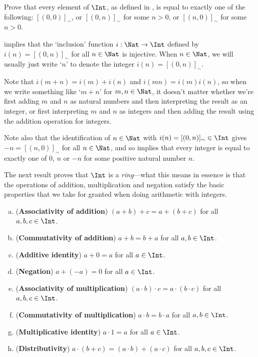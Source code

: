 \begin{exercise}
\label{exRepresentativesOfElementsOfZ}
Prove that every element of $\Int$, as defined in , is equal to exactly one of the following: $[(0,0)]_{\sim}$, or $[(0,n)]_{\sim}$ for some $n>0$, or $[(n,0)]_{\sim}$ for some $n>0$.
\end{exercise}

 implies that the `inclusion' function $i : \Nat \to \Int$ defined by $i(n) = [(0,n)]_{\sim}$ for all $n \in \Nat$ is injective. When $n \in \Nat$, we will usually just write `$n$' to denote the integer $i(n) = [(0,n)]_{\sim}$.

Note that $i(m+n) = i(m)+i(n)$ and $i(mn) = i(m)i(n)$, so when we write something like `$m+n$' for $m,n \in \Nat$, it doesn't matter whether we're first adding $m$ and $n$ as natural numbers and then interpreting the result as an integer, or first interpreting $m$ and $n$ as integers and then adding the result using the addition operation for integers.

Note also that the identification of $n \in \Nat$ with $i(n) = [(0,n)]_{\sim} \in \Int$ gives $-n = [(n,0)]_{\sim}$ for all $n \in \Nat$, and so  implies that every integer is equal to exactly one of $0$, $n$ or $-n$ for some positive natural number $n$.

The next result proves that $\Int$ is a \textit{ring}---what this means in essence is that the operations of addition, multiplication and negation satisfy the basic properties that we take for granted when doing arithmetic with integers.

\begin{theorem}
\label{thmZIsARing}
\fixlistskip%
\begin{enumerate}[(a)]
\item (\textbf{Associativity of addition}) $(a+b)+c = a+(b+c)$ for all $a,b,c \in \Int$.
\item (\textbf{Commutativity of addition}) $a+b=b+a$ for all $a,b \in \Int$.
\item (\textbf{Additive identity}) $a+0 = a$ for all $a \in \Int$.
\item (\textbf{Negation}) $a + (-a) = 0$ for all $a \in \Int$.
\item (\textbf{Associativity of multiplication}) $(a \cdot b) \cdot c = a \cdot (b \cdot c)$ for all $a,b,c \in \Int$.
\item (\textbf{Commutativity of multiplication}) $a \cdot b = b \cdot a$ for all $a,b \in \Int$.
\item (\textbf{Multiplicative identity}) $a \cdot 1 = a$ for all $a \in \Int$.
\item (\textbf{Distributivity}) $a \cdot (b + c) = (a \cdot b) + (a \cdot c)$ for all $a,b,c \in \Int$.
\end{enumerate}
\end{theorem}

